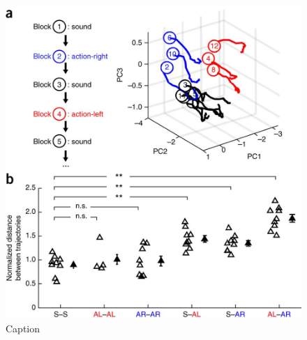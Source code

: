 \begin{figure}[htbp]

\begin{center}
\includegraphics[width=\textwidth]{Figures/NN_fig6.jpg} 
\end{center}

\caption[M2 ensembles revisit previous activity patterns upon re-exposure to corresponding rule]
{Caption}

\label{fig:NN_fig6}
\end{figure}